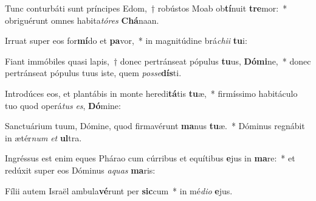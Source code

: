 \item Tunc conturbáti sunt príncipes Edom,~† robústos Moab ob\textbf{tí}nuit \textbf{tre}mor:~* obriguérunt omnes habita\textit{tó}\textit{res} \textbf{Chá}naan.
\item Irruat super eos for\textbf{mí}do et \textbf{pa}vor,~* in magnitúdine brá\textit{chi}\textit{i} \textbf{tu}i:
\item Fiant immóbiles quasi lapis,~† donec pertránseat pópulus \textbf{tu}us, \textbf{Dó}\textbf{mi}ne,~* donec pertránseat pópulus tuus iste, quem \textit{pos}\textit{se}\textbf{dís}ti.
\item Introdúces eos, et plantábis in monte heredi\textbf{tá}tis \textbf{tu}æ,~* firmíssimo habitáculo tuo quod operá\textit{tus} \textit{es}, \textbf{Dó}mine:
\item Sanctuárium tuum, Dómine, quod firmavérunt \textbf{ma}nus \textbf{tu}æ.~* Dóminus regnábit in ætér\textit{num} \textit{et} \textbf{ul}tra.
\item Ingréssus est enim eques Phárao cum cúrribus et equítibus \textbf{e}jus in \textbf{ma}re:~* et redúxit super eos Dóminus \textit{a}\textit{quas} \textbf{ma}ris:
\item Fílii autem Israël ambula\textbf{vé}runt per \textbf{sic}cum~* in mé\textit{di}\textit{o} \textbf{e}jus.
